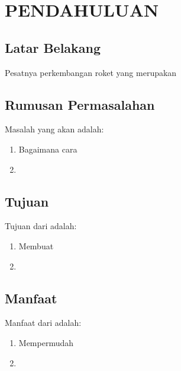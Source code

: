 \chapter{PENDAHULUAN}


\section{Latar Belakang}

Pesatnya perkembangan roket yang merupakan \lipsum[1][1-15]

\lipsum[2][1-10]

\section{Rumusan Permasalahan}

Masalah yang akan \lipsum[3][1-2] adalah:

\begin{enumerate}[nolistsep]

  \item Bagaimana cara \lipsum[3][3-5]

  \item \lipsum[3][6-8]

\end{enumerate}

\section{Tujuan}

Tujuan dari \lipsum[4][1-3] adalah:

\begin{enumerate}[nolistsep]

  \item Membuat \lipsum[4][4-5]

  \item \lipsum[4][6-9]

\end{enumerate}

\section{Manfaat}

Manfaat dari \lipsum[5][1-3] adalah:

\begin{enumerate}[nolistsep]

  \item Mempermudah \lipsum[5][4-5]

  \item \lipsum[5][6-10]

\end{enumerate}

